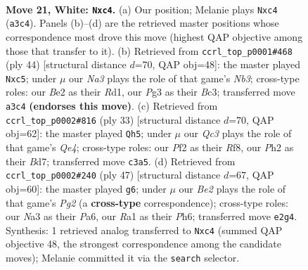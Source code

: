 \documentclass[11pt]{article}
\begin{document}
\clearpage

\begin{figure}[p]\centering
\begin{subfigure}{0.46\textwidth}\centering
\resizebox{\linewidth}{!}{%
\newchessgame
\chessboard[
  setfen={2r1r1k1/pp5p/3bpqp1/4n3/2p5/N1Q3P1/PP2BP1P/R3R1K1 w - - 0 21},
  showmover=false,
  pgfstyle=straightmove, color=movearrow, markmove={a3-c4}
]}
\caption{}
\end{subfigure}\hfill
\begin{subfigure}{0.46\textwidth}\centering
\resizebox{\linewidth}{!}{%
\newchessgame
\chessboard[
  setfen={r5k1/p3bpp1/1pq1p3/2n3rp/2Q5/1NB1P1P1/PP3P1P/R2R2K1 w - - 0 23},
  showmover=false,
  pgfstyle=straightmove, color=movearrow, markmove={b3-c5}
]}
\caption{}
\end{subfigure}
\\[4pt]
\begin{subfigure}{0.46\textwidth}\centering
\resizebox{\linewidth}{!}{%
\newchessgame
\chessboard[
  setfen={4rr1k/pppb2pp/n2p4/3Pq3/4N3/6P1/PP1Q2BP/R3R1K1 b - - 0 17},
  showmover=false,
  pgfstyle=straightmove, color=movearrow, markmove={e5-h5}
]}
\caption{}
\end{subfigure}\hfill
\begin{subfigure}{0.46\textwidth}\centering
\resizebox{\linewidth}{!}{%
\newchessgame
\chessboard[
  setfen={4r1k1/1p3pp1/pq1p3p/4r3/2QNn3/1P5P/1PP2PP1/3RR1K1 b - - 6 24},
  showmover=false,
  pgfstyle=straightmove, color=movearrow, markmove={g7-g6}
]}
\caption{}
\end{subfigure}
\caption{\textbf{Move 21, White: \texttt{Nxc4}.} (a) Our position; Melanie plays \texttt{Nxc4} (\texttt{a3c4}). Panels (b)--(d) are the retrieved master positions whose correspondence most drove this move (highest QAP objective among those that transfer to it). (b) Retrieved from \texttt{ccrl\_top\_p0001\#468} (ply 44) [structural distance $d$=70, QAP obj=48]: the master played \texttt{Nxc5}; under $\mu$ our \emph{Na3} plays the role of that game's \emph{Nb3}; cross-type roles: our \emph{B}e2 as their \emph{R}d1, our \emph{P}g3 as their \emph{B}c3; transferred move \texttt{a3c4} \textbf{(endorses this move)}. (c) Retrieved from \texttt{ccrl\_top\_p0002\#816} (ply 33) [structural distance $d$=70, QAP obj=62]: the master played \texttt{Qh5}; under $\mu$ our \emph{Qc3} plays the role of that game's \emph{Qe4}; cross-type roles: our \emph{P}f2 as their \emph{R}f8, our \emph{P}h2 as their \emph{B}d7; transferred move \texttt{c3a5}. (d) Retrieved from \texttt{ccrl\_top\_p0002\#240} (ply 47) [structural distance $d$=67, QAP obj=60]: the master played \texttt{g6}; under $\mu$ our \emph{Be2} plays the role of that game's \emph{Pg2} (a \textbf{cross-type} correspondence); cross-type roles: our \emph{N}a3 as their \emph{P}a6, our \emph{R}a1 as their \emph{P}h6; transferred move \texttt{e2g4}. Synthesis: 1 retrieved analog transferred to \texttt{Nxc4} (summed QAP objective 48, the strongest correspondence among the candidate moves); Melanie committed it via the \texttt{search} selector.}
\label{fig:thought-m40}
\end{figure}
\end{document}
